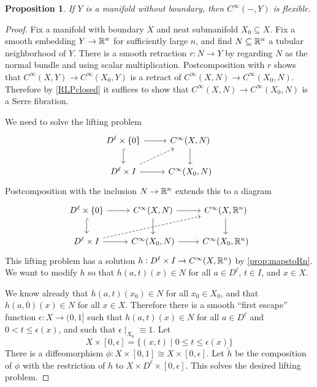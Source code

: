 \documentclass{article}
\newtheorem{proposition}[theorem]{Proposition}
\newtheorem{proposed work}[theorem]{Proposed Work}
\theoremstyle{definition}
\begin{document}
\begin{proposition} \label{prop:mapstonoboundary}
  If $Y$ is a manifold without boundary, then $C^\infty(-, Y)$ is
  flexible. 
\end{proposition}

\begin{proof}
  Fix a manifold with boundary $X$ and neat submanifold
  $X_0\subseteq X$. Fix a smooth embedding $Y\to \mathbb R^n$ for
  sufficiently large $n$, and find $N\subseteq \mathbb R^n$ a tubular
  neighborhood of $Y$. There is a smooth retraction $r: N \to Y$
  by regarding $N$ as the normal bundle and using scalar
  multiplication. Postcomposition with $r$ shows that
  $C^\infty(X,Y)\to C^\infty(X_0, Y)$ is a retract of
  $C^\infty(X, N) \to C^\infty(X_0, N)$. Therefore by \ref{RLPclosed}
  it suffices to show that $C^\infty(X, N) \to C^\infty(X_0, N)$ is a
  Serre fibration.

  We need to solve the lifting problem
  \begin{equation*}
    \begin{tikzcd}
      D^\ell \times \{0\} \arrow[r] \arrow[hookrightarrow]{d}
      & C^\infty(X,N) \arrow[d] 
      \\
      D^\ell \times I \arrow[r] \arrow[dashed,ur] 
      & C^\infty(X_0, N) 
    \end{tikzcd}
  \end{equation*}
  Postcomposition with the inclusion $N\to \mathbb R^n$ extends this to a
  diagram
  \begin{equation*}
    \begin{tikzcd}
      D^\ell \times \{0\} \arrow[r] \arrow[hookrightarrow]{d}
      & C^\infty(X,N) \arrow[d] \arrow[r]
      & C^\infty(X, \R^n) \arrow[d] 
      \\
      D^\ell \times I \arrow[r] \arrow[dashed, urr]
      & C^\infty(X_0, N) \arrow[r]
      & C^\infty(X_0, \R^n)
    \end{tikzcd}
  \end{equation*}
  This lifting problem has a solution
  $h: D^\ell\times I \to C^\infty(X,\mathbb R^n)$ by \ref{prop:mapstoRn}. We
  want to modify $h$ so that $h(a,t)(x)\in N$ for all $a\in D^\ell$,
  $t\in I$, and $x\in X$.

  We know already that $h(a,t)(x_0) \in N$ for all $x_0\in X_0$, and
  that $h(a,0)(x)\in N$ for all $x\in X$. Therefore there is a
  smooth %
  ``first escape'' function $\epsilon :X\to (0,1]$ such
  that $h(a,t)(x)\in N$ for all $a\in D^\ell$ and
  $0 < t \leq \epsilon(x)$, and such that
  $\epsilon \mid_{X_0} \equiv 1$. Let 
  \[
    X\times [0,\epsilon] = \{ (x,t) \mid 0\leq t \leq \epsilon(x) \}
  \]
  There is a diffeomorphism
  $\phi: X\times [0,1] \cong X\times [0,\epsilon]$. Let $\tilde h$ be
  the composition of $\phi$ with the restriction of $h$ to $X\times
  D^\ell \times [0,\epsilon]$. This solves the desired lifting problem.
\end{proof}
\end{document}
